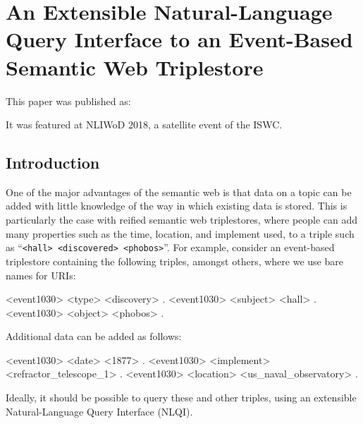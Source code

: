 \documentclass[../main.tex]{subfiles}
\begin{document}
\chapter{An Extensible Natural-Language Query Interface to an Event-Based Semantic Web Triplestore}
\begin{refsection}

\label{chapter:nliwod2018conf}

This paper was published as:


It was featured at NLIWoD 2018, a satellite event of the ISWC.


\section{Introduction}

One of the major advantages of the semantic web is that data on a topic can be added with little
knowledge of the way in which existing data is stored. This is particularly the case with reified semantic web
triplestores, where people can add many properties such as the time, location, and implement used, to
a triple such as ``\texttt{<hall> <discovered> <phobos>}''. For example, consider an event-based triplestore containing the following triples, amongst others, where we use bare names for URIs:

\begin{code}
	<event1030> <type> <discovery> .
	<event1030> <subject> <hall> .
	<event1030> <object> <phobos> .
\end{code}

Additional data can be added as follows:

\begin{code}
	<event1030> <date> <1877> .
	<event1030> <implement> <refractor_telescope_1> .
	<event1030> <location> <us_naval_observatory> .
\end{code}

Ideally, it should be possible to query these and other triples, using an extensible Natural-Language Query Interface (NLQI).


\end{refsection}
\end{document}

